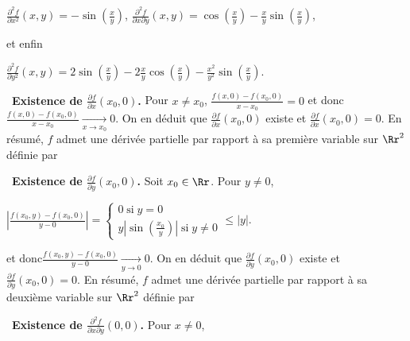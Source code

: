 {\begin{enumerate}
{\begin{center}
$\frac{\partial^2f}{\partial x^2}(x,y)=-\sin\left(\frac{x}{y}\right)$, $\frac{\partial^2f}{\partial x\partial y}(x,y)=\cos\left(\frac{x}{y}\right)-\frac{x}{y}\sin\left(\frac{x}{y}\right)$,
\end{center}
et enfin

\begin{center}
$\frac{\partial^2f}{\partial y^2}(x,y)=2\sin\left(\frac{x}{y}\right)-2\frac{x}{y}\cos\left(\frac{x}{y}\right)-\frac{x^2}{y^2}\sin\left(\frac{x}{y}\right)$.
\end{center}
\textbullet~\textbf{Existence de $\frac{\partial f}{\partial x}(x_0,0)$.} Pour $x\neq x_0$,  $\frac{f(x,0)-f(x_0,0)}{x-x_0}=0$ et donc$\frac{f(x,0)-f(x_0,0)}{x-x_0}\underset{x\rightarrow x_0}{\rightarrow}0$. On en déduit que $\frac{\partial f}{\partial x}(x_0,0)$ existe et $\frac{\partial f}{\partial x}(x_0,0)=0$. En résumé, $f$ admet une dérivée partielle par rapport à sa première variable sur $\Rr^2$ définie par

\begin{center}
\end{center}
\textbullet~\textbf{Existence de $\frac{\partial f}{\partial y}(x_0,0)$.} Soit $x_0\in\Rr$. Pour $y\neq0$,  

\begin{center}
$\left|\frac{f(x_0,y)-f(x_0,0)}{y-0}\right|=\left\{
\begin{array}{l}
0\;\text{si}\;y=0\\
y\left|\sin\left(\frac{x_0}{y}\right)\right|\;\text{si}\;y\neq0
\end{array}
\right.\leqslant|y|.
$
\end{center} 

et donc$\frac{f(x_0,y)-f(x_0,0)}{y-0}\underset{y\rightarrow0}{\rightarrow}0$. On en déduit que $\frac{\partial f}{\partial y}(x_0,0)$ existe et $\frac{\partial f}{\partial y}(x_0,0)=0$. En résumé, $f$ admet une dérivée partielle par rapport à sa deuxième variable sur $\Rr^2$ définie par

\begin{center}
\end{center}
\textbullet~\textbf{Existence de $\frac{\partial^2f}{\partial x\partial y}(0,0)$.} Pour $x\neq0$,

}
\end{enumerate}}
